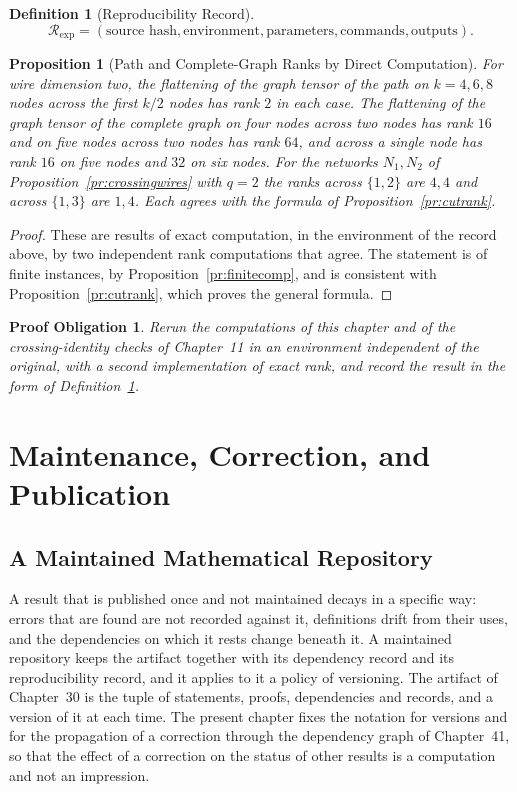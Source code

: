 \documentclass[11pt,letterpaper]{report}
\theoremstyle{plain}
\newtheorem{proposition}[theorem]{Proposition}
\newtheorem{obligation}[theorem]{Proof Obligation}
\theoremstyle{definition}
\newtheorem{definition}[theorem]{Definition}
\theoremstyle{remark}
\begin{document}
\begin{definition}[Reproducibility Record]\label{def:reprecord}
\[\mathcal R_{\mathrm{exp}}=(\text{source hash},\text{environment},\text{parameters},\text{commands},\text{outputs}).\]
\end{definition}

\begin{proposition}[Path and Complete-Graph Ranks by Direct Computation]\label{pr:rankcomp}
For wire dimension two, the flattening of the graph tensor of the path on $k=4,6,8$ nodes across the first $k/2$ nodes has rank $2$ in each case. The flattening of the graph tensor of the complete graph on four nodes across two nodes has rank $16$ and on five nodes across two nodes has rank $64$, and across a single node has rank $16$ on five nodes and $32$ on six nodes. For the networks $N_1,N_2$ of Proposition~\ref{pr:crossingwires} with $q=2$ the ranks across $\{1,2\}$ are $4,4$ and across $\{1,3\}$ are $1,4$. Each agrees with the formula of Proposition~\ref{pr:cutrank}.
\end{proposition}
\begin{proof}
These are results of exact computation, in the environment of the record above, by two independent rank computations that agree. The statement is of finite instances, by Proposition~\ref{pr:finitecomp}, and is consistent with Proposition~\ref{pr:cutrank}, which proves the general formula.
\end{proof}

\begin{obligation}\label{ob:independentenv}
Rerun the computations of this chapter and of the crossing-identity checks of Chapter~11 in an environment independent of the original, with a second implementation of exact rank, and record the result in the form of Definition~\ref{def:reprecord}.
\end{obligation}

\chapter{Maintenance, Correction, and Publication}

\section{A Maintained Mathematical Repository}

A result that is published once and not maintained decays in a specific way: errors that are found are not recorded against it, definitions drift from their uses, and the dependencies on which it rests change beneath it. A maintained repository keeps the artifact together with its dependency record and its reproducibility record, and it applies to it a policy of versioning. The artifact of Chapter~30 is the tuple of statements, proofs, dependencies and records, and a version of it at each time. The present chapter fixes the notation for versions and for the propagation of a correction through the dependency graph of Chapter~41, so that the effect of a correction on the status of other results is a computation and not an impression.
\end{document}
